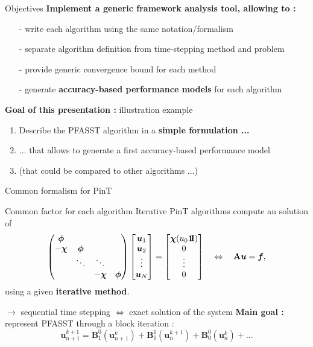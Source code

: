 \documentclass[11pt,aspectratio=43]{beamer}
\newcommand{\ones}{\mbox{1\hspace{-0.2em}I}}
\newcommand{\matr}[1]{\mathbf{#1}}
\newcommand{\vect}[1]{\boldsymbol{#1}}
\newcommand{\uvect}{\vect{u}}
\newcommand{\BMat}{\matr{B}}
\begin{document}
\begin{frame}{Objectives}
	\textbf{Implement a generic framework analysis tool, allowing to :}
    \begin{enumerate}
        \item[-] write each algorithm using the same notation/formalism
        \item[-] separate algorithm definition from time-stepping method and problem
        \item[-] provide generic convergence bound for each method
        \item[-] generate \textbf{accuracy-based performance models} for each algorithm
    \end{enumerate}\vskip30pt
	
	\textbf{Goal of this presentation :} illustration example
	\begin{enumerate}
		\item Describe the PFASST algorithm in a \textbf{simple formulation ...}
		\item ... that allows to generate a first accuracy-based performance model
		\item (that could be compared to other algorithms ...)
	\end{enumerate}
\end{frame}

\begin{frame}{Common formalism for PinT}\vskip10pt
    \begin{block}{Common factor for each algorithm}
    Iterative PinT algorithms compute an solution of 
    $$
    \begin{pmatrix}
        \bm{\phi} & & &\\
        -\bm{\chi} & \bm{\phi} & &\\
        & \ddots & \ddots &\\
        & & -\bm{\chi} & \bm{\phi}
    \end{pmatrix}
    \begin{bmatrix}
        \uvect_1\\\uvect_2\\\vdots\\\uvect_N
    \end{bmatrix}
    =
    \begin{bmatrix}
        \bm{\chi}(u_0\vect{\ones})\\0\\\vdots\\0
    \end{bmatrix}
    \quad \Leftrightarrow \quad 
    \matr{A}\uvect = \vect{f},$$
    using a given \textbf{iterative method}.
    \end{block}
	$\rightarrow$ sequential time stepping $\Leftrightarrow$ exact solution of the system\vskip20pt
	\textbf{Main goal :} represent PFASST through a block iteration :
	$$
	\uvect^{k+1}_{n+1} = \BMat^0_1(\uvect^k_{n+1})
	+ \BMat^1_0(\uvect^{k+1}_{n}) + \BMat^0_0(\uvect^{k}_{n}) + ...
	$$
\end{frame}
\end{document}
